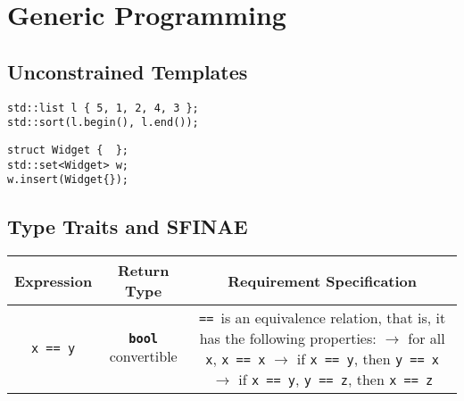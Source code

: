 \section{Generic Programming} \label{sec:generic_programming}







\subsection{Unconstrained Templates} \label{sec:unconstrained_templates}

    

    \begin{lstlisting}
std::list l { 5, 1, 2, 4, 3 };
std::sort(l.begin(), l.end()); \end{lstlisting}

    \begin{lstlisting}
struct Widget {  };
std::set<Widget> w;
w.insert(Widget{}); \end{lstlisting}

    

\subsection{Type Traits and SFINAE} \label{sec:type_traits_and_sfinae}

    \begin{table}[h]
    \begin{tabular}{ccc}
        \toprule
        \bf{Expression} & \bf{Return Type} & \bf{Requirement Specification} \\
        \midrule
        \texttt{x == y} & \textbf{\texttt{bool}} convertible & \makecell[l]{\texttt{==}\, is an equivalence relation, that is,\\
                                                                it has the following properties:\\
                                                                $\rightarrow$ for all \texttt{x}, \texttt{x == x}\\
                                                                $\rightarrow$ if \texttt{x == y}, then \texttt{y == x}\\
                                                                $\rightarrow$ if \texttt{x == y}, \texttt{y == z}, then \texttt{x == z}} \\
        \bottomrule
    \end{tabular}
    \end{table}

